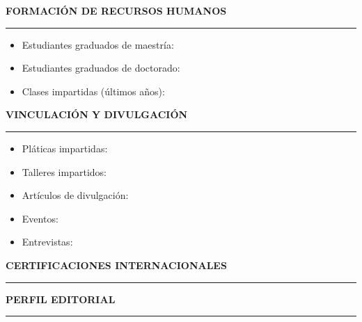 \documentclass[10pt]{article}
\begin{document}
\vspace{0.3cm}
{\bf FORMACIÓN DE RECURSOS HUMANOS}
\vspace{3pt}
\hrule

\begin{itemize}
	\item Estudiantes graduados de maestría:
	

	\item Estudiantes graduados de doctorado:
	
	
	\item Clases impartidas (últimos años):
	
\end{itemize}


\vspace{0.3cm}
\textbf{VINCULACIÓN Y DIVULGACIÓN}
\vspace{3pt}
\hrule

\begin{itemize}
	\item Pláticas impartidas:
	
	
	\item Talleres impartidos:
	
	
	\item Artículos de divulgación:
	
	
	\item Eventos:
	
	
	\item Entrevistas:
	
\end{itemize}


\vspace{0.3cm}
\textbf{CERTIFICACIONES INTERNACIONALES}
\vspace{3pt}
\hrule


\vspace{0.5cm}
\textbf{PERFIL EDITORIAL}
\vspace{3pt}
\hrule
\begin{itemize}

\end{itemize}





%

\end{document}
